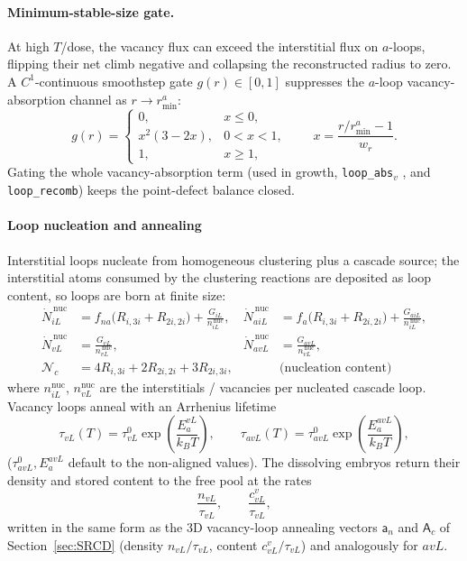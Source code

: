\documentclass{article}
\newcommand{\spvec}[1]{\bm{\mathsf{#1}}}   %
\begin{document}
\paragraph{Minimum-stable-size gate.}
At high $T$/dose, the vacancy flux can exceed the interstitial flux on $a$-loops,
flipping their net climb negative and collapsing the reconstructed radius to
zero. A $C^1$-continuous smoothstep gate $g(r)\in[0,1]$ suppresses the $a$-loop
vacancy-absorption channel as $r\to r_{\min}^{a}$:
\begin{equation}
g(r)=
\begin{cases}
0, & x\le0,\\
x^2(3-2x), & 0<x<1,\\
1, & x\ge1,
\end{cases}
\qquad x=\frac{r/r_{\min}^{a}-1}{w_{r}}.
\end{equation}
Gating the whole vacancy-absorption term (used in growth, \texttt{loop\_abs}$_v$
, and \texttt{loop\_recomb}) keeps the point-defect balance closed.

\paragraph{Loop nucleation and annealing}
Interstitial loops nucleate from homogeneous clustering plus a cascade source;
the interstitial atoms consumed by the clustering reactions are deposited as
loop content, so loops are born at finite size:
\begin{align}
\dot N_{iL}^{\,\mathrm{nuc}}&=f_{na}\bigl(R_{i,3i}+R_{2i,2i}\bigr)+\frac{G_{iL}}{n_{iL}^{\,\mathrm{nuc}}}, &
\dot N_{aiL}^{\,\mathrm{nuc}}&=f_{a}\bigl(R_{i,3i}+R_{2i,2i}\bigr)+\frac{G_{aiL}}{n_{iL}^{\,\mathrm{nuc}}},\\
\dot N_{vL}^{\,\mathrm{nuc}}&=\frac{G_{vL}}{n_{vL}^{\,\mathrm{nuc}}}, &
\dot N_{avL}^{\,\mathrm{nuc}}&=\frac{G_{avL}}{n_{vL}^{\,\mathrm{nuc}}},\\
\mathcal{N}_c&=4R_{i,3i}+2R_{2i,2i}+3R_{2i,3i}, & & \text{(nucleation content)}
\end{align}
where $n_{iL}^{\mathrm{nuc}}$, $n_{vL}^{\mathrm{nuc}}$ are the interstitials /
vacancies per nucleated cascade loop. Vacancy loops anneal with an Arrhenius
lifetime
\begin{equation}
\tau_{vL}(T)=\tau_{vL}^{0}\exp\!\left(\frac{E_a^{vL}}{k_BT}\right),
\qquad \tau_{avL}(T)=\tau_{avL}^{0}\exp\!\left(\frac{E_a^{avL}}{k_BT}\right),
\end{equation}
($\tau_{avL}^{0},E_a^{avL}$ default to the non-aligned values). The dissolving embryos return their density and stored content to the free pool at the rates
\begin{equation}
\frac{n_{vL}}{\tau_{vL}},\qquad \frac{c_{vL}^{v}}{\tau_{vL}},
\end{equation}
written in the same form as the $3$D vacancy-loop annealing vectors $\spvec{a}_n$ and $\spvec{A}_c$ of Section~\ref{sec:SRCD} (density $n_{vL}/\tau_{vL}$, content $c_{vL}^{v}/\tau_{vL}$)
and analogously for $avL$.
\end{document}
